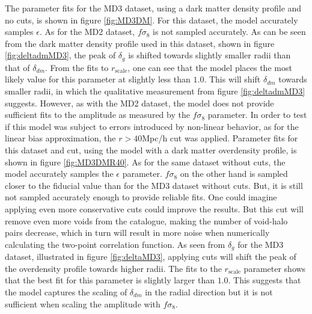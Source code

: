 The parameter fits for the MD3 dataset, using a dark matter density profile and no cuts, is shown in figure \ref{fig:MD3DM}. For this dataset, the model accurately samples $\epsilon$. As for the MD2 dataset, $f\sigma_8$ is not sampled accurately. As can be seen from the dark matter density profile used in this dataset, shown in figure \ref{fig:deltadmMD3}, the peak of $\delta_g$ is shifted towards slightly smaller radii than that of $\delta_{dm}$. From the fits to $r_{\mathrm{scale}}$, one can see that the model places the most likely value for this parameter at slightly less than $1.0$. This will shift $\delta_{dm}$ towards smaller radii, in which the qualitative measurement from figure \ref{fig:deltadmMD3} suggests. However, as with the MD2 dataset, the model does not provide sufficient fits to the amplitude as measured by the $f\sigma_8$ parameter. In order to test if this model was subject to errors introduced by non-linear behavior, as for the linear bias approximation, the $r>40$Mpc/h cut was applied. Parameter fits for this dataset and cut, using the model with a dark matter overdensity profile, is shown in figure \ref{fig:MD3DMR40}. As for the same dataset without cuts, the model accurately samples the $\epsilon$ parameter. $f\sigma_8$ on the other hand is sampled closer to the fiducial value than for the MD3 dataset without cuts. But, it is still not sampled accurately enough to provide reliable fits. One could imagine applying even more conservative cuts could improve the results. But this cut will remove even more voids from the catalogue, making the number of void-halo pairs decrease, which in turn will result in more noise when numerically calculating the two-point correlation function. As seen from $\delta_g$ for the MD3 dataset, illustrated in figure \ref{fig:deltaMD3}, applying cuts will shift the peak of the overdensity profile towards higher radii. The fits to the $r_{\mathrm{scale}}$ parameter shows that the best fit for this parameter is slightly larger than $1.0$. This suggests that the model captures the scaling of $\delta_{dm}$ in the radial direction but it is not sufficient when scaling the amplitude with $f\sigma_8$.\\\indent

